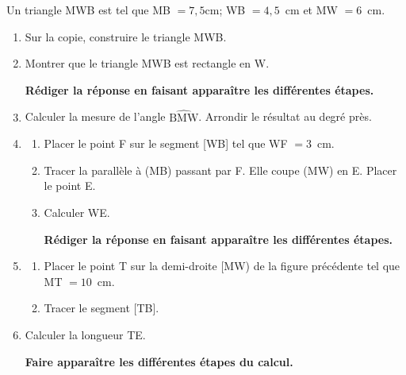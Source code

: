 \documentclass[exercice,a4]{thedocument}%
\begin{document}
%

\medskip

Un triangle MWB est tel que MB $= 7,5$cm; WB $= 4,5$~cm et MW $= 6$~cm.

\medskip

\begin{enumerate}
\item Sur la copie, construire le triangle MWB.
\item Montrer que le triangle MWB est rectangle en W.

\textbf{Rédiger la réponse en faisant apparaître les différentes étapes.}
\item Calculer la mesure de l'angle $\widehat{\text{BMW}}$. Arrondir le résultat au degré près.
\item
	\begin{enumerate}
		\item Placer le point F sur le segment [WB] tel que WF $= 3$~cm.
		\item Tracer la parallèle à (MB) passant par F. Elle coupe (MW) en E. Placer le point E.
		\item Calculer WE.

\textbf{Rédiger la réponse en faisant apparaître les différentes étapes.}
	\end{enumerate}
\item
	\begin{enumerate}
		\item Placer le point T sur la demi-droite [MW) de la figure précédente tel que MT $= 10$~cm.
		\item Tracer le segment [TB].
	\end{enumerate}
\item Calculer la longueur TE.

\textbf{Faire apparaître les différentes étapes du calcul.}
\end{enumerate}

\bigskip

\showthesource
\end{document}
